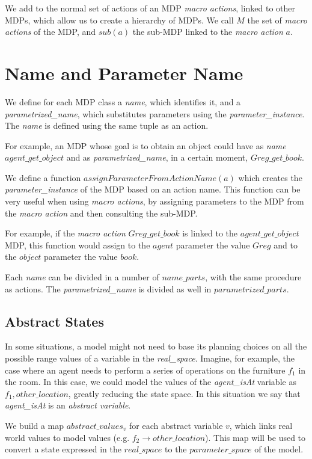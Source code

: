 We add to the normal set of actions of an MDP \textit{macro actions}, linked to other MDPs, which allow us to create a hierarchy of MDPs. We call $M$ the set of \textit{macro actions} of the MDP, and $sub(a)$ the sub-MDP linked to the \textit{macro action} $a$.

\section{Name and Parameter Name}
We define for each MDP class a \textit{name}, which identifies it, and a \textit{parametrized\_name}, which substitutes parameters using the \textit{parameter\_instance}. The \textit{name} is defined using the same tuple as an action. 

For example, an MDP whose goal is to obtain an object could have as \textit{name} $agent\_get\_object$ and as \textit{parametrized\_name}, in a certain moment, $Greg\_get\_book$.

We define a function $assignParameterFromActionName(a)$ which creates the \textit{parameter\_instance} of the MDP based on an action name. This function can be very useful when using \textit{macro actions}, by assigning parameters to the MDP from the \textit{macro action} and then consulting the sub-MDP.

For example, if the \textit{macro action} $Greg\_get\_book$ is linked to the $agent\_get\_object$ MDP, this function would assign to the $agent$ parameter the value $Greg$ 
and to the $object$ parameter the value $book$.

Each \textit{name} can be divided in a number of $name\_parts$,  with the same procedure as actions. The \textit{parametrized\_name} is divided as well in $parametrized\_parts$.


\subsection{Abstract States}

In some situations, a model might not need to base its planning choices on all the possible range values of a variable in the \textit{real\_space}. Imagine, for example, the case where an agent needs to perform a series of operations on the furniture $f_1$ in the room. In this case, we could model the  values of the \textit{agent\_isAt} variable as ${f_1 , other\_location}$, greatly reducing the state space. In this situation we say that \textit{agent\_isAt} is an \textit{abstract variable}. 

We build a map $abstract\_values_v$ for each abstract variable $v$, which links real world values to model values (e.g. $f_2 \rightarrow other\_location$). This map will be used to convert a state expressed in the $real\_space$ to the $parameter\_space$ of the model. 


